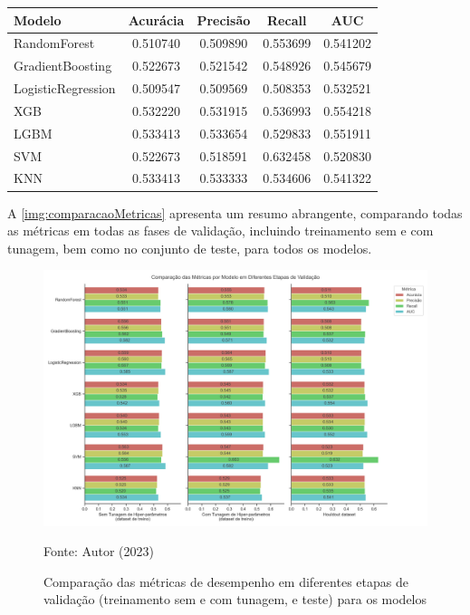 \begin{table}[htb]
	{
		\begin{tabular}{lcccc}
			\toprule
			\textbf{Modelo} & \textbf{Acurácia} & \textbf{Precisão} & \textbf{Recall} & \textbf{AUC} \\
			\midrule \midrule
			RandomForest & 0.510740 & 0.509890 & 0.553699 & 0.541202 \\
			\midrule
			GradientBoosting & 0.522673 & 0.521542 & 0.548926 & 0.545679 \\
			\midrule
			LogisticRegression & 0.509547 & 0.509569 & 0.508353 & 0.532521 \\
			\midrule
			XGB & 0.532220 & 0.531915 & 0.536993 & 0.554218 \\
			\midrule
			LGBM & 0.533413 & 0.533654 & 0.529833 & 0.551911 \\
			\midrule
			SVM & 0.522673 & 0.518591 & 0.632458 & 0.520830 \\
			\midrule
			KNN & 0.533413 & 0.533333 & 0.534606 & 0.541322 \\
			\bottomrule
		\end{tabular}
	}
	{
	}
\end{table}

A \autoref{img:comparacaoMetricas} apresenta um resumo abrangente, comparando todas as métricas em todas as fases de validação, incluindo treinamento sem e com tunagem, bem como no conjunto de teste, para todos os modelos.

\begin{figure}[htb]
	\centering
	\caption{\label{img:comparacaoMetricas}Comparação das métricas de desempenho em diferentes etapas de validação (treinamento sem e com tunagem, e teste) para os modelos}
	\includegraphics[scale=0.5]{USPSC-img/comparacao_metricas_por_modelo.png}
	\begin{center}
		Fonte: Autor (2023)
	\end{center}
\end{figure}


